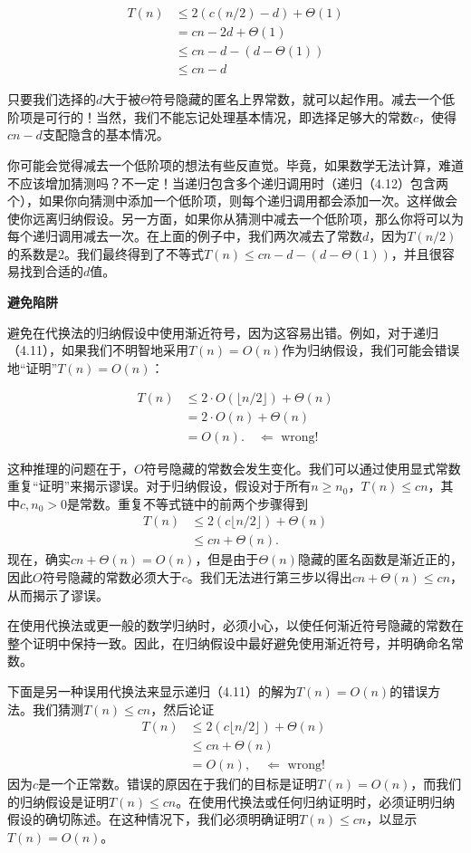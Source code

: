 \documentclass[lang=cn,newtx,10pt,scheme=chinese]{elegantbook}
\begin{document}
$$
\begin{aligned}
T(n) & \leq 2(c(n / 2)-d)+\Theta(1) \\
& =c n-2 d+\Theta(1) \\
& \leq c n-d-(d-\Theta(1)) \\
& \leq c n-d
\end{aligned}
$$

只要我们选择的$d$大于被$\Theta$符号隐藏的匿名上界常数，就可以起作用。减去一个低阶项是可行的！当然，我们不能忘记处理基本情况，即选择足够大的常数$c$，使得$c n-d$支配隐含的基本情况。

你可能会觉得减去一个低阶项的想法有些反直觉。毕竟，如果数学无法计算，难道不应该增加猜测吗？不一定！当递归包含多个递归调用时（递归（4.12）包含两个），如果你向猜测中添加一个低阶项，则每个递归调用都会添加一次。这样做会使你远离归纳假设。另一方面，如果你从猜测中减去一个低阶项，那么你将可以为每个递归调用减去一次。在上面的例子中，我们两次减去了常数$d$，因为$T(n/2)$的系数是2。我们最终得到了不等式$T(n) \leq c n-d-(d-\Theta(1))$，并且很容易找到合适的$d$值。

\textbf{避免陷阱}

避免在代换法的归纳假设中使用渐近符号，因为这容易出错。例如，对于递归（4.11），如果我们不明智地采用$T(n)=O(n)$作为归纳假设，我们可能会错误地“证明”$T(n)=O(n)$：

$$
\begin{aligned}
T(n) & \leq 2 \cdot O(\lfloor n / 2\rfloor)+\Theta(n) \\
& =2 \cdot O(n)+\Theta(n) \\
& =O(n) . \quad \Longleftarrow \text { wrong! }
\end{aligned}
$$

这种推理的问题在于，$O$符号隐藏的常数会发生变化。我们可以通过使用显式常数重复“证明”来揭示谬误。对于归纳假设，假设对于所有$n \geq n_0$，$T(n) \leq c n$，其中$c, n_0>0$是常数。重复不等式链中的前两个步骤得到
$$
\begin{aligned}
T(n) & \leq 2(c\lfloor n / 2\rfloor)+\Theta(n) \\
& \leq c n+\Theta(n) .
\end{aligned}
$$
现在，确实$c n+\Theta(n)=O(n)$，但是由于$\Theta(n)$隐藏的匿名函数是渐近正的，因此$O$符号隐藏的常数必须大于$c$。我们无法进行第三步以得出$c n+\Theta(n) \leq c n$，从而揭示了谬误。

在使用代换法或更一般的数学归纳时，必须小心，以使任何渐近符号隐藏的常数在整个证明中保持一致。因此，在归纳假设中最好避免使用渐近符号，并明确命名常数。

下面是另一种误用代换法来显示递归（4.11）的解为$T(n)=O(n)$的错误方法。我们猜测$T(n) \leq c n$，然后论证
$$
\begin{aligned}
T(n) & \leq 2(c\lfloor n / 2\rfloor)+\Theta(n) \\
& \leq c n+\Theta(n) \\
& =O(n), \quad \Longleftarrow \text { wrong! }
\end{aligned}
$$
因为$c$是一个正常数。错误的原因在于我们的目标是证明$T(n)=O(n)$，而我们的归纳假设是证明$T(n) \leq c n$。在使用代换法或任何归纳证明时，必须证明归纳假设的确切陈述。在这种情况下，我们必须明确证明$T(n) \leq c n$，以显示$T(n)=O(n)$。
\end{document}

